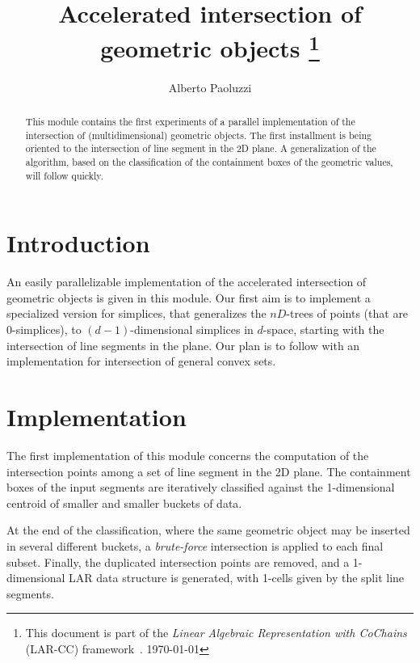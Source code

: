 \documentclass[11pt,oneside]{article}    %
\title{Accelerated intersection of geometric objects
\footnote{This document is part of the \emph{Linear Algebraic Representation with CoChains} (LAR-CC) framework~\cite{cclar-proj:2013:00}. \today}
}
\author{Alberto Paoluzzi}
\begin{document}
\maketitle
\nonstopmode

\begin{abstract}
This module contains the first experiments of a parallel implementation of the intersection of (multidimensional) geometric objects. The first installment is being oriented to the intersection of line segment in the 2D plane. A generalization of the algorithm, based on the classification of the containment boxes of the geometric values, will follow quickly.
\end{abstract}

\tableofcontents

\section{Introduction}

An easily parallelizable implementation of the accelerated intersection of geometric objects is given in this module. Our first aim is to implement a specialized version for simplices, that generalizes the $nD$-trees of points (that are 0-simplices), to $(d-1)$-dimensional simplices in $d$-space, starting with the intersection of line segments in the plane. Our plan is to follow with an implementation for intersection of general convex sets.


\section{Implementation}

The first implementation of this module concerns the computation of the intersection points among a set of line segment in the 2D plane. The containment boxes of the input segments are iteratively classified against the 1-dimensional centroid of smaller and smaller buckets of data. 

At the end of the classification, where the same geometric object may be inserted in several different buckets, a \emph{brute-force} intersection is applied to each final subset. Finally, the duplicated intersection points are removed, and a 1-dimensional LAR data structure is generated, with 1-cells given by the split line segments. 
\end{document}
